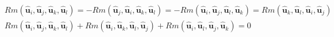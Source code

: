 \documentclass{article}
\begin{document}
\begin{align}
&Rm(\widehat{\boldsymbol{u}}_i,\widehat{\boldsymbol{u}}_j,\widehat{\boldsymbol{u}}_k,\widehat{\boldsymbol{u}}_l)=-Rm(\widehat{\boldsymbol{u}}_j,\widehat{\boldsymbol{u}}_i,\widehat{\boldsymbol{u}}_k,\widehat{\boldsymbol{u}}_l)=-Rm(\widehat{\boldsymbol{u}}_i,\widehat{\boldsymbol{u}}_j,\widehat{\boldsymbol{u}}_l,\widehat{\boldsymbol{u}}_k)=Rm(\widehat{\boldsymbol{u}}_k,\widehat{\boldsymbol{u}}_l,\widehat{\boldsymbol{u}}_i,\widehat{\boldsymbol{u}}_j)\\
&Rm(\widehat{\boldsymbol{u}}_i,\widehat{\boldsymbol{u}}_j,\widehat{\boldsymbol{u}}_k,\widehat{\boldsymbol{u}}_l)+Rm(\widehat{\boldsymbol{u}}_i,\widehat{\boldsymbol{u}}_k,\widehat{\boldsymbol{u}}_l,\widehat{\boldsymbol{u}}_j)+Rm(\widehat{\boldsymbol{u}}_i,\widehat{\boldsymbol{u}}_l,\widehat{\boldsymbol{u}}_j,\widehat{\boldsymbol{u}}_k)=0
\end{align}
\end{document}
